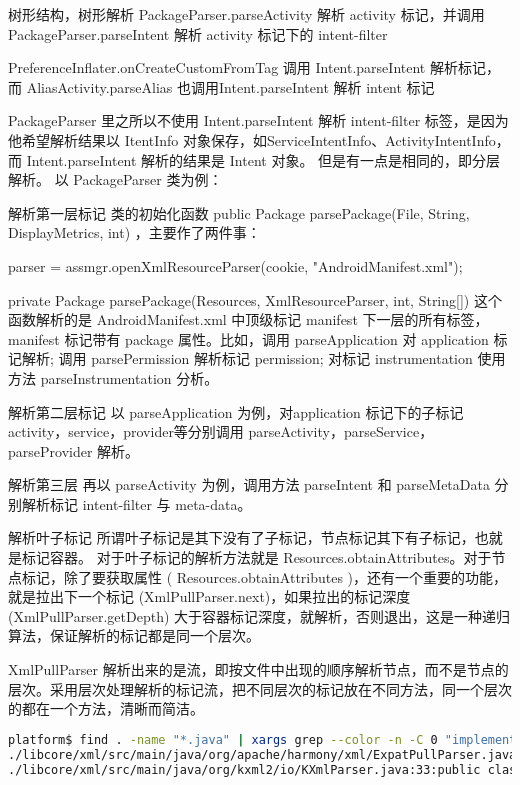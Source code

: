 \documentclass[a4paper,11pt]{article}
\begin{document}
树形结构，树形解析
PackageParser.parseActivity  解析 activity 标记，并调用
PackageParser.parseIntent 解析 activity 标记下的 intent-filter

PreferenceInflater.onCreateCustomFromTag 调用 Intent.parseIntent 解析标记，
而 AliasActivity.parseAlias 也调用Intent.parseIntent 解析 intent 标记

PackageParser 里之所以不使用 Intent.parseIntent 解析 intent-filter
标签，是因为他希望解析结果以 ItentInfo 
对象保存，如ServiceIntentInfo、ActivityIntentInfo， 而 Intent.parseIntent
解析的结果是 Intent 对象。
但是有一点是相同的，即分层解析。
以 PackageParser 类为例：
\begin{enumerate*}
    \item 解析第一层标记
类的初始化函数 public Package parsePackage(File, String, DisplayMetrics,
int) ，主要作了两件事：
\begin{description*}
    \item[创建解析文件 AndroidManifest.xml 的解析器]
    parser = assmgr.openXmlResourceParser(cookie, "AndroidManifest.xml");
\item [调用解析函数解析]
    private Package parsePackage(Resources, XmlResourceParser, int, String[])
    这个函数解析的是 AndroidManifest.xml 中顶级标记 manifest
    下一层的所有标签，manifest 标记带有 package
    属性。比如，调用 parseApplication 对 application 标记解析; 调用
    parsePermission 解析标记 permission; 对标记 instrumentation
    使用方法 parseInstrumentation 分析。
    \end{description*}
\item 解析第二层标记
以 parseApplication 为例，对application 标记下的子标记 activity，service，provider等分别调用
parseActivity，parseService，parseProvider 解析。

\item 解析第三层
再以 parseActivity 为例，调用方法 parseIntent 和 parseMetaData 分别解析标记
intent-filter 与 meta-data。

\item 解析叶子标记
所谓叶子标记是其下没有了子标记，节点标记其下有子标记，也就是标记容器。
对于叶子标记的解析方法就是
Resources.obtainAttributes。对于节点标记，除了要获取属性 (
Resources.obtainAttributes )，还有一个重要的功能，就是拉出下一个标记
(XmlPullParser.next)，如果拉出的标记深度 (XmlPullParser.getDepth)
大于容器标记深度，就解析，否则退出，这是一种递归算法，保证解析的标记都是同一个层次。
\end{enumerate*}

XmlPullParser
解析出来的是流，即按文件中出现的顺序解析节点，而不是节点的层次。采用层次处理解析的标记流，把不同层次的标记放在不同方法，同一个层次的都在一个方法，清晰而简洁。
\begin{lstlisting}[language=bash,]
platform$ find . -name "*.java" | xargs grep --color -n -C 0 "implements\s*XmlPullParser"
./libcore/xml/src/main/java/org/apache/harmony/xml/ExpatPullParser.java:34:public class ExpatPullParser implements XmlPullParser {
./libcore/xml/src/main/java/org/kxml2/io/KXmlParser.java:33:public class KXmlParser implements XmlPullParser {
\end{lstlisting}
\end{document}
